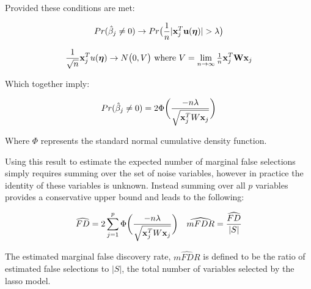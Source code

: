  Provided these conditions are met:

\begin{equation}
Pr(\hat{\beta}_j \neq 0)  \rightarrow Pr\big(\frac{1}{n}|\mathbf{x}_{j}^T \mathbf{u}(\boldsymbol{\eta})| > \lambda\big)
\end{equation}

\begin{equation}
\frac{1}{\sqrt{n}}\mathbf{x}_{j}^T u(\boldsymbol{\eta}) \rightarrow N\big(0, V\big) 
\text{   where } V = \lim_{n \to \infty} \tfrac{1}{n}\mathbf{x}_{j}^T \mathbf{W} \mathbf{x}_{j}
\end{equation}

Which together imply:

\begin{equation}
Pr(\hat{\beta}_j \neq 0)  = 2\Phi \bigg( \frac{-n\lambda}{\sqrt{ \mathbf{x}_j^TW\mathbf{x}_j}} \bigg)
\end{equation}

Where $\Phi$ represents the standard normal cumulative density function.


Using this result to estimate the expected number of marginal false selections simply requires summing over the set of noise variables, however in practice the identity of these variables is unknown. Instead summing over all $p$ variables provides a conservative upper bound and leads to the following:

\begin{align}
&\widehat{FD} = 2 \sum_{j=1}^{p} \Phi \bigg( \frac{-n\lambda}{\sqrt{\mathbf{x}_j^T W \mathbf{x}_j}} \bigg) & \widehat{mFDR} = \frac{\widehat{FD}}{|S|}
\end{align}

The estimated marginal false discovery rate, $\widehat{mFDR}$ is defined to be the ratio of estimated false selections to $|S|$, the total number of variables selected by the lasso model.

